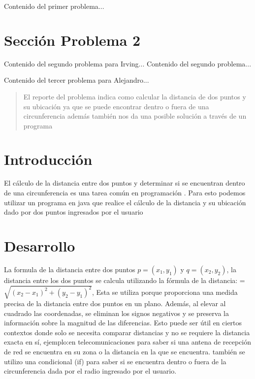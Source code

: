 \documentclass{IEEEcsmag}
\begin{document}
\newpage
Contenido del primer problema...
\newpage


\section{Sección Problema 2}
Contenido del segundo problema para Irving...
\newpage
Contenido del segundo problema...
\newpage


Contenido del tercer problema para Alejandro...
\newpage 
\begin{abstract}
    
    El reporte del problema indica como calcular la distancia de dos puntos y su ubicación ya que se puede encontrar dentro o fuera de una circunferencia además también nos da una posible solución a través de un programa 
\end{abstract}


\section{Introducción}
El cálculo de la distancia entre dos puntos y determinar si se encuentran dentro de una circunferencia es una tarea común en programación . Para esto podemos utilizar un programa en java que realice el cálculo de la distancia y su ubicación dado por dos puntos ingresados por el usuario 

\section{Desarrollo}
La formula de la distancia entre dos puntos $p = (x_1, y_1)$ y $q = (x_2, y_2)$, la distancia entre los dos puntos se calcula utilizando la fórmula de la distancia:
 = $\sqrt{{(x_2 - x_1)^2 + (y_2 - y_1)^2}}$,
Esta se utiliza porque proporciona una medida precisa de la distancia entre dos puntos en un plano. Además, al elevar al cuadrado las coordenadas, se eliminan los signos negativos y se preserva la información sobre la magnitud  de las diferencias. Esto puede ser útil en ciertos contextos donde solo se necesita comparar distancias y no se requiere la distancia exacta en sí, ejemplo:en telecomunicaciones para saber si una antena de recepción de red se encuentra en su zona o la distancia en la que se encuentra.
también se utilizo una condicional (if) para saber si se encuentra dentro o fuera de la circunferencia dada por el radio ingresado por el usuario.
\end{document}
